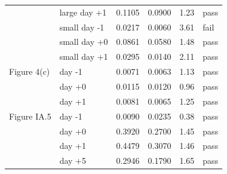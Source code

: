 \begin{longtable}{llrrrl}
 & large day +1 & 0.1105 & 0.0900 & 1.23 & pass \\
 & small day -1 & 0.0217 & 0.0060 & 3.61 & fail \\
 & small day +0 & 0.0861 & 0.0580 & 1.48 & pass \\
 & small day +1 & 0.0295 & 0.0140 & 2.11 & pass \\
\midrule
Figure 4(c) & day -1 & 0.0071 & 0.0063 & 1.13 & pass \\
 & day +0 & 0.0115 & 0.0120 & 0.96 & pass \\
 & day +1 & 0.0081 & 0.0065 & 1.25 & pass \\
\midrule
Figure IA.5 & day -1 & 0.0090 & 0.0235 & 0.38 & pass \\
 & day +0 & 0.3920 & 0.2700 & 1.45 & pass \\
 & day +1 & 0.4479 & 0.3070 & 1.46 & pass \\
 & day +5 & 0.2946 & 0.1790 & 1.65 & pass \\
\bottomrule
\end{longtable}
